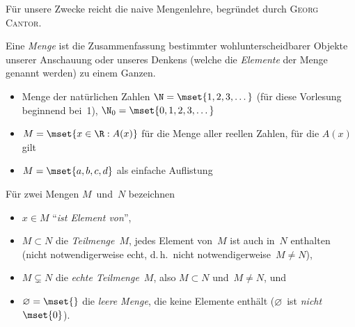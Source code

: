 \documentclass[a4paper]{article}
\begin{document}
Für unsere Zwecke reicht die naive Mengenlehre, begründet durch \textsc{Georg Cantor}.

\begin{definition}
    Eine \emph{Menge} ist die Zusammenfassung bestimmter wohlunterscheidbarer Objekte unserer Anschauung oder unseres Denkens (welche die \emph{Elemente} der Menge genannt werden) zu einem Ganzen.
\end{definition}

\begin{example}\leavevmode
    \begin{itemize}
        \item Menge der natürlichen Zahlen $\N = \mset{1, 2, 3, \dots}$ (für diese Vorlesung beginnend bei~1), $\N_0 = \mset{0, 1, 2, 3, \dots}$
        \item $M = \mset{x \in \R : A(x)}$ für die Menge aller reellen Zahlen, für die $A(x)$ gilt
        \item $M = \mset{a, b, c, d}$ als einfache Auflistung
    \end{itemize}
\end{example}

\begin{notation}
    Für zwei Mengen $M$~und~$N$ bezeichnen
    \begin{itemize}
        \item $x \in M$ "`\emph{ist Element von}"',
        \item $M \subset N$ die \emph{Teilmenge}~$M$, jedes Element von~$M$ ist auch in~$N$ enthalten (nicht notwendigerweise echt, d.\,h.\ nicht notwendigerweise~$M \neq N$),
        \item $M \subsetneq N$ die \emph{echte Teilmenge}~$M$, also $M \subset N$ und~$M \neq N$, und
        \item $\varnothing = \mset{}$ die \emph{leere Menge}, die keine Elemente enthält ($\varnothing$~ist \emph{nicht}~$\mset{0}$).
    \end{itemize}
\end{notation}
\end{document}
